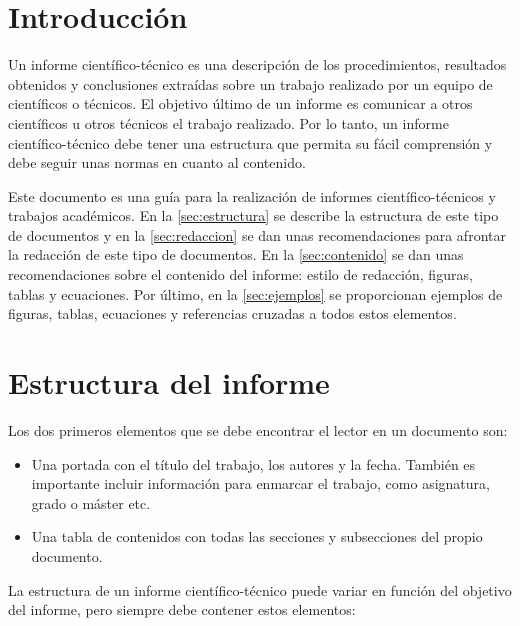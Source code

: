 \documentclass[11pt]{article}
\begin{document}
\section{Introducción}
\label{sec:introduccion}

Un informe científico-técnico es una descripción de los procedimientos, resultados obtenidos y conclusiones extraídas sobre un trabajo realizado por un equipo de científicos o técnicos. El objetivo último de un informe es comunicar a otros científicos u otros técnicos el trabajo realizado. Por lo tanto, un informe científico-técnico debe tener una estructura que permita su fácil comprensión y debe seguir unas normas en cuanto al contenido.

Este documento es una guía para la realización de informes científico-técnicos y trabajos académicos. En la \autoref{sec:estructura} se describe la estructura de este tipo de documentos y en la \autoref{sec:redaccion} se dan unas recomendaciones para afrontar la redacción de este tipo de documentos. En la \autoref{sec:contenido} se dan unas recomendaciones sobre el contenido del informe: estilo de redacción, figuras, tablas y ecuaciones. Por último, en la \autoref{sec:ejemplos} se proporcionan ejemplos de figuras, tablas, ecuaciones y referencias cruzadas a todos estos elementos.


\section{Estructura del informe}
\label{sec:estructura}

Los dos primeros elementos que se debe encontrar el lector en un documento son:

\begin{itemize}

    \item Una portada con el título del trabajo, los autores y la fecha. También es importante incluir información para enmarcar el trabajo, como asignatura, grado o máster etc.
    
    \item Una tabla de contenidos con todas las secciones y subsecciones del propio documento.
    
\end{itemize}

La estructura de un informe científico-técnico puede variar en función del objetivo del informe, pero siempre debe contener estos elementos:
\end{document}

